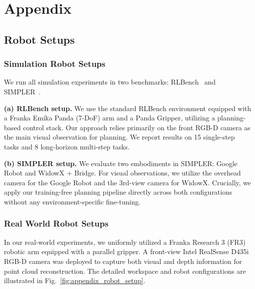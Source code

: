 

\section{Appendix}
\subsection{Robot Setups}
\subsubsection{Simulation Robot Setups}
We run all simulation experiments in two benchmarks: RLBench~\cite{james2020rlbench} and SIMPLER~\cite{li2025evaluating}.  

\textbf{(a) RLBench setup.} We use the standard RLBench environment equipped with a Franka Emika Panda (7-DoF) arm and a Panda Gripper, utilizing a planning-based control stack. Our approach relies primarily on the front RGB-D camera as the main visual observation for planning. We report results on 15 single-step tasks and 8 long-horizon multi-step tasks.

\textbf{(b) SIMPLER setup.} We evaluate two embodiments in SIMPLER: Google Robot and WidowX + Bridge. For visual observations, we utilize the overhead camera for the Google Robot and the 3rd-view camera for WidowX. Crucially, we apply our training-free planning pipeline directly across both configurations without any environment-specific fine-tuning.

\subsubsection{Real World Robot Setups}

In our real-world experiments, we uniformly utilized a Franka Research 3 (FR3) robotic arm equipped with a parallel gripper. A front-view Intel RealSense D435i RGB-D camera was deployed to capture both visual and depth information for point cloud reconstruction. The detailed workspace and robot configurations are illustrated in Fig.~\ref{fig:appendix_robot_setup}.

